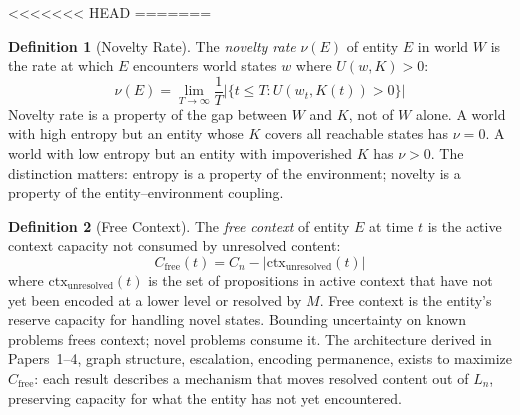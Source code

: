 \documentclass[11pt]{article}
\theoremstyle{definition}
\newtheorem{definition}{Definition}
\theoremstyle{remark}
\begin{document}
<<<<<<< HEAD
=======
\begin{definition}[Novelty Rate]
\label{def:novelty}
The \emph{novelty rate} $\nu(E)$ of entity $E$ in world $W$ is the rate
at which $E$ encounters world states $w$ where $U(w, K) > 0$:
\[
\nu(E) = \lim_{T \to \infty} \frac{1}{T}
\bigl|\{t \leq T : U(w_t, K(t)) > 0\}\bigr|
\]
Novelty rate is a property of the gap between $W$ and $K$, not of $W$
alone. A world with high entropy but an entity whose $K$ covers all
reachable states has $\nu = 0$. A world with low entropy but an entity
with impoverished $K$ has $\nu > 0$. The distinction matters: entropy is
a property of the environment; novelty is a property of the
entity--environment coupling.
\end{definition}

\begin{definition}[Free Context]
\label{def:free}
The \emph{free context} of entity $E$ at time $t$ is the active context
capacity not consumed by unresolved content:
\[
C_{\mathrm{free}}(t) = C_n - |\mathrm{ctx}_{\mathrm{unresolved}}(t)|
\]
where $\mathrm{ctx}_{\mathrm{unresolved}}(t)$ is the set of
propositions in active context that have not yet been encoded at a lower
level or resolved by $M$. Free context is the entity's reserve capacity
for handling novel states. Bounding uncertainty on known problems frees
context; novel problems consume it. The architecture derived in
Papers~1--4, graph structure, escalation, encoding permanence, exists
to maximize $C_{\mathrm{free}}$: each result describes a mechanism that
moves resolved content out of $L_n$, preserving capacity for what the
entity has not yet encountered.
\end{definition}
\end{document}
